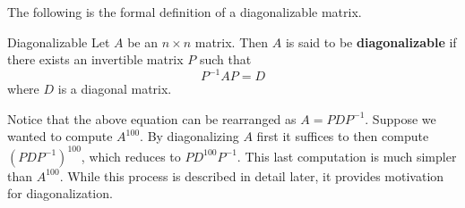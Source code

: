 The following is the formal definition of a diagonalizable matrix. 

\begin{definition}{Diagonalizable}\label{def:diagonalizable}
Let $A$ be an $n\times n$ matrix. Then $A$ is said to be \textbf{diagonalizable}
 if there exists an invertible matrix $P$ such that
\begin{equation*}
P^{-1}AP=D
\end{equation*}
where $D$ is a diagonal matrix.
\end{definition}

Notice that the above equation can be rearranged as $A=PDP^{-1}$. Suppose we wanted to compute $A^{100}$. By diagonalizing $A$ first it suffices to then compute $\left(PDP^{-1}\right)^{100}$, which reduces to $PD^{100}P^{-1}$. This last computation is much simpler than $A^{100}$. While this process is described in detail later, it provides motivation for diagonalization. 